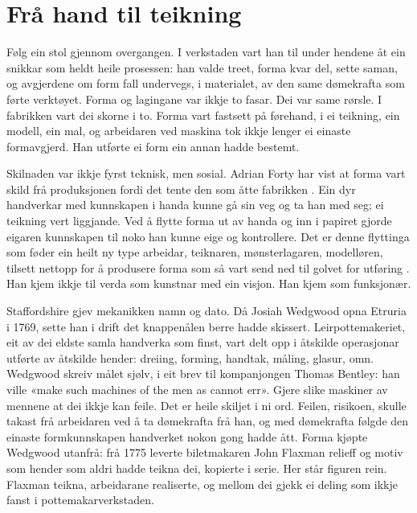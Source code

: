 \section{Frå hand til teikning}

Følg ein stol gjennom overgangen. I verkstaden vart han til under hendene åt ein snikkar som heldt heile prosessen: han valde treet, forma kvar del, sette saman, og avgjerdene om form fall undervegs, i materialet, av den same dømekrafta som førte verktøyet. Forma og lagingane var ikkje to fasar. Dei var same rørsle. I fabrikken vart dei skorne i to. Forma vart fastsett på førehand, i ei teikning, ein modell, ein mal, og arbeidaren ved maskina tok ikkje lenger ei einaste formavgjerd. Han utførte ei form ein annan hadde bestemt.

Skilnaden var ikkje fyrst teknisk, men sosial. Adrian Forty har vist at forma vart skild frå produksjonen fordi det tente den som åtte fabrikken \autocite{forty1986}. Ein dyr handverkar med kunnskapen i handa kunne gå sin veg og ta han med seg; ei teikning vert liggjande. Ved å flytte forma ut av handa og inn i papiret gjorde eigaren kunnskapen til noko han kunne eige og kontrollere. Det er denne flyttinga som føder ein heilt ny type arbeidar, teiknaren, mønsterlagaren, modelløren, tilsett nettopp for å produsere forma som så vart send ned til golvet for utføring \autocite{heskett1980}. Han kjem ikkje til verda som kunstnar med ein visjon. Han kjem som funksjonær.

Staffordshire gjev mekanikken namn og dato. Då Josiah Wedgwood opna Etruria i 1769, sette han i drift det knappenålen berre hadde skissert. Leirpottemakeriet, eit av dei eldste samla handverka som finst, vart delt opp i åtskilde operasjonar utførte av åtskilde hender: dreiing, forming, handtak, måling, glasur, omn. Wedgwood skreiv målet sjølv, i eit brev til kompanjongen Thomas Bentley: han ville «make such machines of the men as cannot err». Gjere slike maskiner av mennene at dei ikkje kan feile. Det er heile skiljet i ni ord. Feilen, risikoen, skulle takast frå arbeidaren ved å ta dømekrafta frå han, og med dømekrafta følgde den einaste formkunnskapen handverket nokon gong hadde ått. Forma kjøpte Wedgwood utanfrå: frå 1775 leverte biletmakaren John Flaxman relieff og motiv som hender som aldri hadde teikna dei, kopierte i serie. Her står figuren rein. Flaxman teikna, arbeidarane realiserte, og mellom dei gjekk ei deling som ikkje fanst i pottemakarverkstaden.

